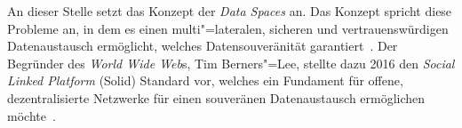 An dieser Stelle setzt das Konzept der \emph{Data Spaces} an. Das Konzept spricht diese Probleme an, in dem es einen multi"=lateralen, sicheren und vertrauenswürdigen Datenaustausch ermöglicht, welches Datensouveränität garantiert~\cite{mollerIndustrialDataEcosystems2024}.
Der Begründer des \emph{World Wide Web}s, Tim Berners"=Lee, stellte dazu 2016 den \emph{Social Linked Platform} (Solid) Standard vor, welches ein Fundament für offene, dezentralisierte Netzwerke für einen souveränen Datenaustausch ermöglichen möchte~\cite{mecklerWebLinkedData2023}.


